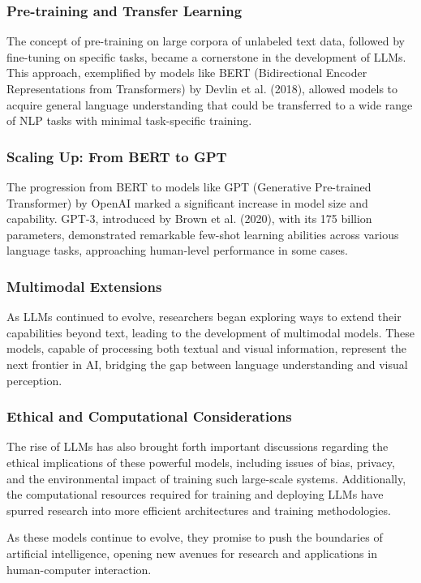 \subsubsection{Pre-training and Transfer Learning}
The concept of pre-training on large corpora of unlabeled text data, followed by fine-tuning on specific tasks, became a cornerstone in the development of LLMs. This approach, exemplified by models like BERT (Bidirectional Encoder Representations from Transformers) by Devlin et al. (2018), allowed models to acquire general language understanding that could be transferred to a wide range of NLP tasks with minimal task-specific training.

\subsubsection{Scaling Up: From BERT to GPT}
The progression from BERT to models like GPT (Generative Pre-trained Transformer) by OpenAI marked a significant increase in model size and capability. GPT-3, introduced by Brown et al. (2020), with its 175 billion parameters, demonstrated remarkable few-shot learning abilities across various language tasks, approaching human-level performance in some cases.

\subsubsection{Multimodal Extensions}
As LLMs continued to evolve, researchers began exploring ways to extend their capabilities beyond text, leading to the development of multimodal models. These models, capable of processing both textual and visual information, represent the next frontier in AI, bridging the gap between language understanding and visual perception.

\subsubsection{Ethical and Computational Considerations}
The rise of LLMs has also brought forth important discussions regarding the ethical implications of these powerful models, including issues of bias, privacy, and the environmental impact of training such large-scale systems. Additionally, the computational resources required for training and deploying LLMs have spurred research into more efficient architectures and training methodologies.

As these models continue to evolve, they promise to push the boundaries of artificial intelligence, opening new avenues for research and applications in human-computer interaction.

